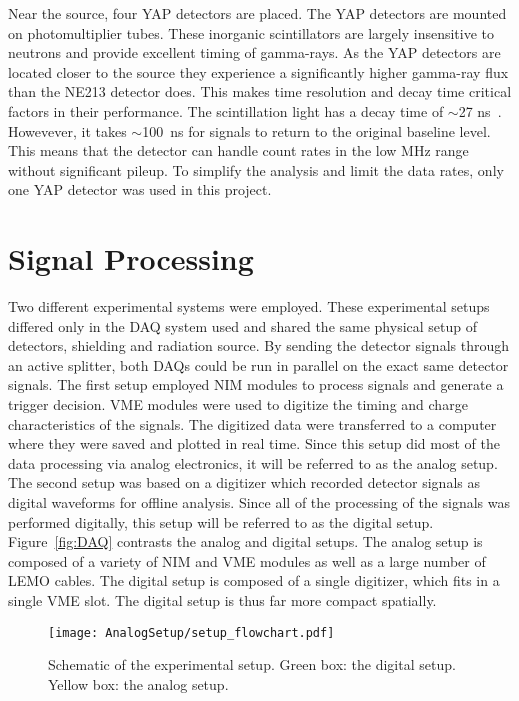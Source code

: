 \documentclass[main.tex]{subfiles}
\begin{document}
Near the source, four YAP detectors are placed. The YAP detectors are mounted on photomultiplier tubes. These inorganic scintillators are largely insensitive to neutrons and provide excellent timing of gamma-rays. As the YAP detectors are located closer to the source they experience a significantly higher gamma-ray flux than the NE213 detector does. This makes time resolution and decay time critical factors in their performance. The scintillation light has a decay time of $\sim$27 ns~\cite{Scionix}. Howevever, it takes $\sim$\SI{100}{ns} for signals to return to the original baseline level. This means that the detector can handle count rates in the low MHz range without significant pileup. To simplify the analysis and limit the data rates, only one YAP detector was used in this project.

\section{Signal Processing}
Two different experimental systems were employed. These experimental setups differed only in the DAQ system used and shared the same physical setup of detectors, shielding and radiation source. By sending the detector signals through an active splitter, both DAQs could be run in parallel on the exact same detector signals. The first setup employed NIM modules to process signals and generate a trigger decision. VME modules were used to digitize the timing and charge characteristics of the signals. The digitized data were transferred to a computer where they were saved and plotted in real time. Since this setup did most of the data processing via analog electronics, it will be referred to as the analog setup. The second setup was based on a digitizer which recorded detector signals as digital waveforms for offline analysis. Since all of the processing of the signals was performed digitally, this setup will be referred to as the digital setup. Figure~\ref{fig:DAQ} contrasts the analog and digital setups. The analog setup is composed of a variety of NIM and VME modules as well as a large number of LEMO cables. The digital setup is composed of a single digitizer, which fits in a single VME slot. The digital setup is thus far more compact spatially.

\begin{figure}[h]
    \centering
        \texttt{[image: AnalogSetup/setup\_flowchart.pdf]}
        \caption[Schematic of the experimental setup.]{Schematic of the experimental setup. Green box: the digital setup. Yellow box: the analog setup.}
    \label{fig:setup}
\end{figure}
\end{document}
